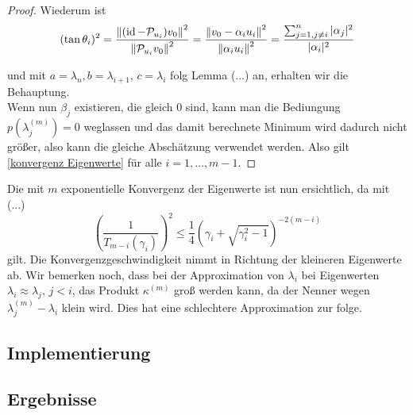 \documentclass{article}
\begin{document}
\begin{theorem}
\begin{proof}
	Wiederum ist
	\begin{equation*}
		(\tan\theta_i)^2 = \frac{{\left \| (\operatorname{id} - \mathcal{P}_{u_i})v_0 \right \|}_{}^2}{{\left \|  \mathcal{P}_{u_i}v_0 \right \|}_{}^2} = \frac{{\left \| v_0 - \alpha_i u_i \right \|}_{}^2}{{\left \| \alpha_i u_i \right \|}_{}^2} = \frac{\sum_{\substack{j=1, j\neq i}}^{n} |\alpha_j|^2}{|\alpha_i|^2}
	\end{equation*}

	und  mit $a = \lambda_n, b= \lambda_{i+1}$, $c = \lambda_i$ folg Lemma (...) an, erhalten wir die Behauptung.\\

	Wenn nun $\beta_j$ existieren, die gleich 0 sind, kann man die Bediungung $p(\lambda_j^{(m)}) = 0$ weglassen und das damit berechnete Minimum wird dadurch nicht größer, also kann die gleiche Abschätzung verwendet werden.
	Also gilt \ref{konvergenz Eigenwerte} für alle $i = 1, \dots, m-1$.
	\end{proof}
\end{theorem}

Die mit $m$ exponentielle Konvergenz der Eigenwerte ist nun ersichtlich, da mit (...)
\begin{equation*}
	\left(\frac{1}{T_{m-i}(\gamma_i)}\right)^2 \le \frac{1}{4} \left(\gamma_i + \sqrt{\gamma_i^2 -1}\right)^{-2(m-i)}
\end{equation*}
gilt. Die Konvergenzgeschwindigkeit nimmt in Richtung der kleineren Eigenwerte ab. Wir bemerken noch, dass bei der Approximation von $\lambda_i$ bei Eigenwerten $\lambda_i \approx \lambda_j, \, j < i$, das Produkt $\kappa^{(m)}$ groß werden kann, da der Nenner wegen $\lambda^{(m)}_j - \lambda_i$ klein wird. Dies hat eine schlechtere Approximation zur folge.


\subsection{Implementierung}

\subsection{Ergebnisse}

\newpage

\end{document}

